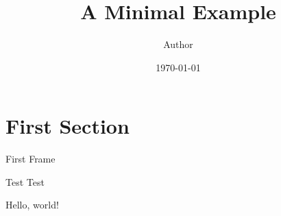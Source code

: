 \documentclass{beamer}
\title{A Minimal Example}
\date{\today}
\author{Author}
\institute{Institute}
\begin{document}
\maketitle
\section{First Section}
\begin{frame}{First Frame}
	\begin{alertblock}{Test}
		Test
	\end{alertblock}
	Hello, world!
\end{frame}
\end{document}

